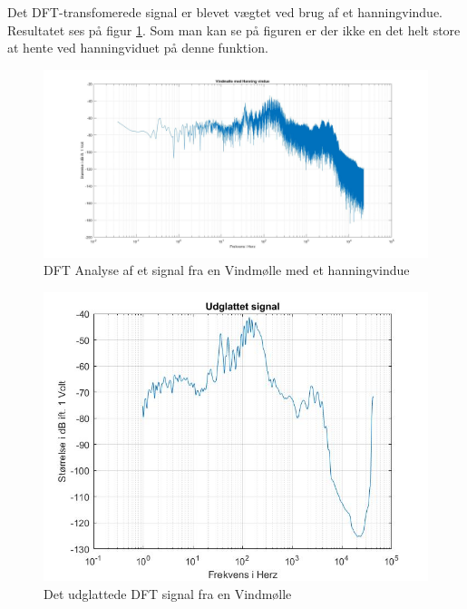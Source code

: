 Det DFT-transfomerede signal er blevet vægtet ved brug af et hanningvindue. Resultatet ses på figur \ref{fig:Vind hanning}. Som man kan se på figuren er der ikke en det helt store at hente ved hanningviduet på denne funktion.
\begin{figure}[H]
	\centering
	\includegraphics[width=140mm]{figures/Vind/hanning.jpg}
	\caption{DFT Analyse af et signal fra en Vindmølle med et hanningvindue}
	\label{fig:Vind hanning}
\end{figure}

\begin{figure}[H]
	\centering
	\includegraphics[width=140mm]{figures/Vind/udglattet.jpg}
	\caption{Det udglattede DFT signal fra en Vindmølle}
	\label{fig:Vind udglattet}
\end{figure}


